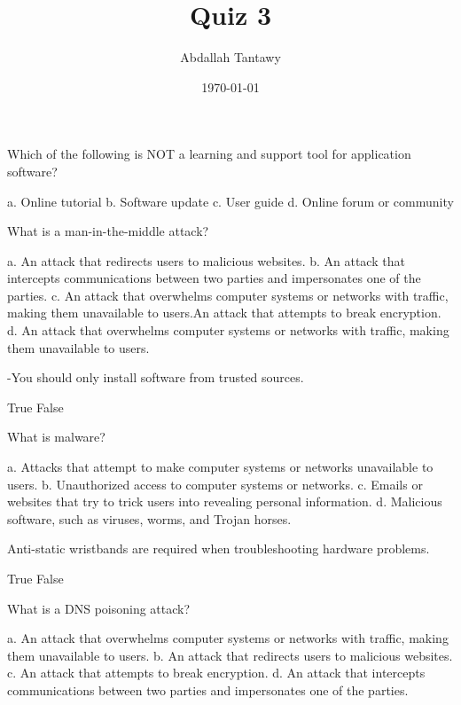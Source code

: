 \documentclass{exam}
\title{Quiz 3}
\author{Abdallah Tantawy}
\date{\today}
\begin{document}
\maketitle

\begin{questions}

\printanswers

\question Which of the following is NOT a learning and support tool for application software?
\begin{checkboxes}
\choice a. Online tutorial
\CorrectChoice b. Software update
\choice c. User guide
\choice d. Online forum or community
\end{checkboxes}

\question What is a man-in-the-middle attack?
\begin{checkboxes}
\choice a. An attack that redirects users to malicious websites.
\CorrectChoice b. An attack that intercepts communications between two parties and impersonates one of the parties.
\choice c. An attack that overwhelms computer systems or networks with traffic, making them unavailable to users.An attack that attempts to break encryption.
\choice d. An attack that overwhelms computer systems or networks with traffic, making them unavailable to users.
\end{checkboxes}

-You should only install software from trusted sources.
\begin{checkboxes}
\CorrectChoice True
\choice False
\end{checkboxes}

\question What is malware?
\begin{checkboxes}
\choice a. Attacks that attempt to make computer systems or networks unavailable to users.
\choice b. Unauthorized access to computer systems or networks.
\choice c. Emails or websites that try to trick users into revealing personal information.
\CorrectChoice d. Malicious software, such as viruses, worms, and Trojan horses.
\end{checkboxes}

\question Anti-static wristbands are required when troubleshooting hardware problems.
\begin{checkboxes}
\choice True
\CorrectChoice False
\end{checkboxes}

\question What is a DNS poisoning attack?
\begin{checkboxes}
\choice a. An attack that overwhelms computer systems or networks with traffic, making them unavailable to users.
\CorrectChoice b. An attack that redirects users to malicious websites.
\choice c. An attack that attempts to break encryption.
\choice d. An attack that intercepts communications between two parties and impersonates one of the parties.
\end{checkboxes}


\end{questions}
\end{document}
